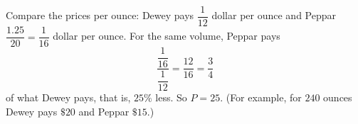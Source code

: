 Compare the prices per ounce: Dewey pays $\dfrac{1}{12}$ dollar per ounce and Peppar $\dfrac{1.25}{20}=\dfrac{1}{16}$ dollar per ounce. For the same volume, Peppar pays
\[
\dfrac{\dfrac{1}{16}}{\dfrac{1}{12}}=\dfrac{12}{16}=\dfrac{3}{4}
\]
of what Dewey pays, that is, $25\%$ less. So $P=\boxed{25}$. (For example, for $240$ ounces Dewey pays $\$20$ and Peppar $\$15$.)
